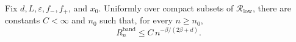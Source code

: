 Fix \(d,L,\varepsilon,f_-,f_+\), and \(x_0\).  Uniformly over compact
subsets of \(\mathcal R_{\mathrm{low}}\), there are constants \(C<\infty\)
and \(n_0\) such that, for every \(n\geq n_0\),
\[
R_n^{\mathrm{band}}\leq C\,n^{-\beta/(2\beta+d)}.
\]